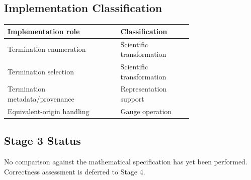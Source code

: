 \subsection{Implementation Classification}

\begin{center}
\begin{tabular}{|p{0.45\linewidth}|p{0.28\linewidth}|}
\hline
Implementation role & Classification\\
\hline
Termination enumeration & Scientific transformation\\
Termination selection & Scientific transformation\\
Termination metadata/provenance & Representation support\\
Equivalent-origin handling & Gauge operation\\
\hline
\end{tabular}
\end{center}

\subsection{Stage 3 Status}

No comparison against the mathematical specification has yet been
performed. Correctness assessment is deferred to Stage 4.
